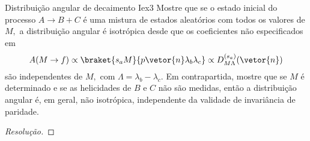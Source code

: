 \begin{exercício}{Distribuição angular de decaimento I}{ex3}
   Mostre que se o estado inicial do processo \(A \to B + C\) é uma mistura de estados aleatórios com todos os valores de \(M,\) a distribuição angular é isotrópica desde que os coeficientes não especificados em
   \begin{equation*}
      A(M \to f) \propto \braket{s_a M}{p \vetor{n} \lambda_b \lambda_c} \propto D^{(s_a)}_{M \Lambda}(\vetor{n})
   \end{equation*}
   são independentes de \(M,\) com \(\Lambda = \lambda_b - \lambda_c.\) Em contrapartida, mostre que se \(M\) é determinado e se as helicidades de \(B\) e \(C\) não são medidas, então a distribuição angular é, em geral, não isotrópica, independente da validade de invariância de paridade.
\end{exercício}
\begin{proof}[Resolução]
    
\end{proof}
